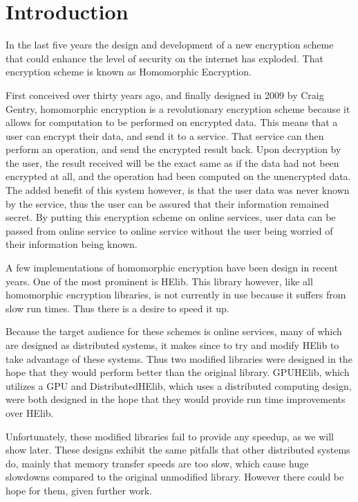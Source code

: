 \chapter{Introduction} \label{chap:Introduction}
In the last five years the design and development of a new encryption scheme that could enhance the level of security on the internet has exploded. That encryption scheme is known as Homomorphic Encryption. 

First conceived over thirty years ago, and finally designed in 2009 by Craig Gentry, homomorphic encryption is a revolutionary encryption scheme because it allows for computation to be performed on encrypted data. This means that a user can encrypt their data, and send it to a service. That service can then perform an operation, and send the encrypted result back. Upon decryption by the user, the result received will be the exact same as if the data had not been encrypted at all, and the operation had been computed on the unencrypted data. The added benefit of this system however, is that the user data was never known by the service, thus the user can be assured that their information remained secret. By putting this encryption scheme on online services, user data can be passed from online service to online service without the user being worried of their information being known.

A few implementations of homomorphic encryption have been design in recent years. One of the most prominent is HElib. This library however, like all homomorphic encryption libraries, is not currently in use because it suffers from slow run times. Thus there is a desire to speed it up. 

Because the target audience for these schemes is online services, many of which are designed as distributed systems, it makes since to try and modify HElib to take advantage of these systems. Thus two modified libraries were designed in the hope that they would perform better than the original library. GPUHElib, which utilizes a GPU and DistributedHElib, which uses a distributed computing design, were both designed in the hope that they would provide run time improvements over HElib. 

Unfortunately, these modified libraries fail to provide any speedup, as we will show later. These designs exhibit the same pitfalls that other distributed systems do, mainly that memory transfer speeds are too slow, which cause huge slowdowns compared to the original unmodified library. However there could be hope for them, given further work.